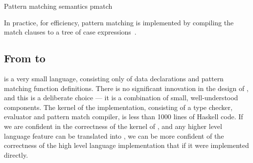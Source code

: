 {Pattern matching semantics}
{pmatch}

In practice, for efficiency, pattern matching is implemented by compiling the match clauses to
a tree of case expressions~\cite{Augustsson1985}. 

\subsection{From \Idris{} to \TT{}}

\TT{} is a very small language, consisting only of data declarations and pattern matching
function definitions. There is no significant innovation in the design of \TT{}, and this
is a deliberate choice --- it is a combination of small, well-understood components.
The kernel of the \TT{} implementation, consisting of a type checker, evaluator and
pattern match compiler, is less than 1000 lines of Haskell code. If we are confident
in the correctness of the kernel of \TT{}, and any higher level language feature
can be translated into \TT{}, we can be more confident of the correctness of the high
level language implementation that if it were implemented directly.


